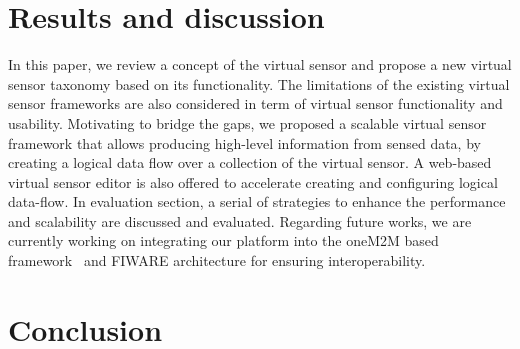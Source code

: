 \section{Results and discussion}
In this paper, we review a concept of the virtual sensor and propose a new virtual sensor taxonomy based on its functionality. The limitations of the existing virtual sensor frameworks are also considered in term of virtual sensor functionality and usability. Motivating to bridge the gaps, we proposed a scalable virtual sensor framework that allows producing high-level information from sensed data, by creating a logical data flow over a collection of the virtual sensor. A web-based virtual sensor editor is also offered to accelerate creating and configuring logical data-flow. In evaluation section, a serial of strategies to enhance the performance and scalability are discussed and evaluated. Regarding future works, we are currently working on integrating our platform into the oneM2M based framework~\cite{DattaGyrardBonnetBoudaoud2015} and FIWARE  architecture for ensuring interoperability.
\section{Conclusion}
